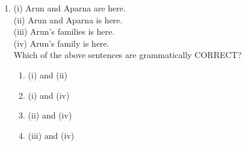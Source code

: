 \documentclass[journal]{IEEEtran}
\begin{document}
\begin{enumerate}
\item (i) Arun and Aparna are here.\\
(ii) Arun and Aparna is here.\\
(iii) Arun's families is here.\\
(iv) Arun's family is here.\\
Which of the above sentences are grammatically CORRECT?
\begin{multicols}{2}
    \begin{enumerate}
        \item (i) and (ii)
        \item (i) and (iv)
        \item (ii) and (iv)
        \item (iii) and (iv)
    \end{enumerate}
\end{multicols}


\end{enumerate}
\end{document}
